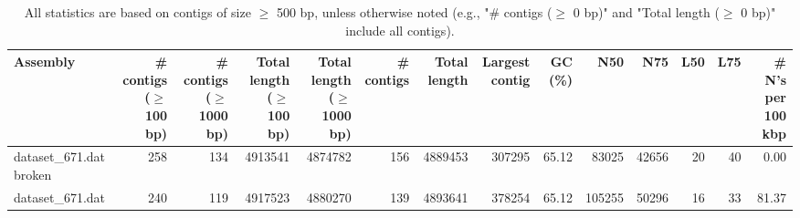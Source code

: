 \documentclass[12pt,a4paper]{article}
\begin{document}
\begin{table}[ht]
\begin{center}
\caption{All statistics are based on contigs of size $\geq$ 500 bp, unless otherwise noted (e.g., "\# contigs ($\geq$ 0 bp)" and "Total length ($\geq$ 0 bp)" include all contigs).}
\begin{tabular}{|l*{13}{|r}|}
\hline
Assembly & \# contigs ($\geq$ 100 bp) & \# contigs ($\geq$ 1000 bp) & Total length ($\geq$ 100 bp) & Total length ($\geq$ 1000 bp) & \# contigs & Total length & Largest contig & GC (\%) & N50 & N75 & L50 & L75 & \# N's per 100 kbp \\ \hline
dataset\_671.dat broken & 258 & 134 & 4913541 & 4874782 & 156 & 4889453 & 307295 & 65.12 & 83025 & 42656 & 20 & 40 & 0.00 \\ \hline
dataset\_671.dat & 240 & 119 & 4917523 & 4880270 & 139 & 4893641 & 378254 & 65.12 & 105255 & 50296 & 16 & 33 & 81.37 \\ \hline
\end{tabular}
\end{center}
\end{table}
\end{document}
